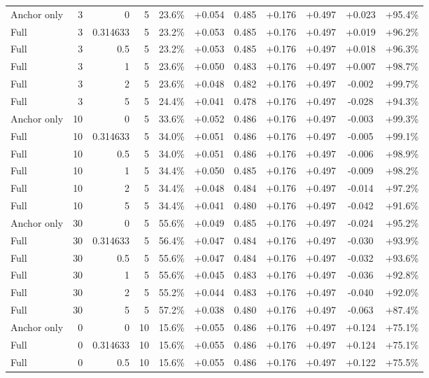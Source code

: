 \begin{table}[htbp]
\begin{tabular}{lrrrccccccc}
Anchor only & 3 & 0 & 5 & 23.6\% & +0.054 & 0.485 & +0.176 & +0.497 & +0.023 & +95.4\% \\
Full & 3 & 0.314633 & 5 & 23.2\% & +0.053 & 0.485 & +0.176 & +0.497 & +0.019 & +96.2\% \\
Full & 3 & 0.5 & 5 & 23.2\% & +0.053 & 0.485 & +0.176 & +0.497 & +0.018 & +96.3\% \\
Full & 3 & 1 & 5 & 23.6\% & +0.050 & 0.483 & +0.176 & +0.497 & +0.007 & +98.7\% \\
Full & 3 & 2 & 5 & 23.6\% & +0.048 & 0.482 & +0.176 & +0.497 & -0.002 & +99.7\% \\
Full & 3 & 5 & 5 & 24.4\% & +0.041 & 0.478 & +0.176 & +0.497 & -0.028 & +94.3\% \\
Anchor only & 10 & 0 & 5 & 33.6\% & +0.052 & 0.486 & +0.176 & +0.497 & -0.003 & +99.3\% \\
Full & 10 & 0.314633 & 5 & 34.0\% & +0.051 & 0.486 & +0.176 & +0.497 & -0.005 & +99.1\% \\
Full & 10 & 0.5 & 5 & 34.0\% & +0.051 & 0.486 & +0.176 & +0.497 & -0.006 & +98.9\% \\
Full & 10 & 1 & 5 & 34.4\% & +0.050 & 0.485 & +0.176 & +0.497 & -0.009 & +98.2\% \\
Full & 10 & 2 & 5 & 34.4\% & +0.048 & 0.484 & +0.176 & +0.497 & -0.014 & +97.2\% \\
Full & 10 & 5 & 5 & 34.4\% & +0.041 & 0.480 & +0.176 & +0.497 & -0.042 & +91.6\% \\
Anchor only & 30 & 0 & 5 & 55.6\% & +0.049 & 0.485 & +0.176 & +0.497 & -0.024 & +95.2\% \\
Full & 30 & 0.314633 & 5 & 56.4\% & +0.047 & 0.484 & +0.176 & +0.497 & -0.030 & +93.9\% \\
Full & 30 & 0.5 & 5 & 55.6\% & +0.047 & 0.484 & +0.176 & +0.497 & -0.032 & +93.6\% \\
Full & 30 & 1 & 5 & 55.6\% & +0.045 & 0.483 & +0.176 & +0.497 & -0.036 & +92.8\% \\
Full & 30 & 2 & 5 & 55.2\% & +0.044 & 0.483 & +0.176 & +0.497 & -0.040 & +92.0\% \\
Full & 30 & 5 & 5 & 57.2\% & +0.038 & 0.480 & +0.176 & +0.497 & -0.063 & +87.4\% \\
Anchor only & 0 & 0 & 10 & 15.6\% & +0.055 & 0.486 & +0.176 & +0.497 & +0.124 & +75.1\% \\
Full & 0 & 0.314633 & 10 & 15.6\% & +0.055 & 0.486 & +0.176 & +0.497 & +0.124 & +75.1\% \\
Full & 0 & 0.5 & 10 & 15.6\% & +0.055 & 0.486 & +0.176 & +0.497 & +0.122 & +75.5\% \\

\end{tabular}
\end{table}
